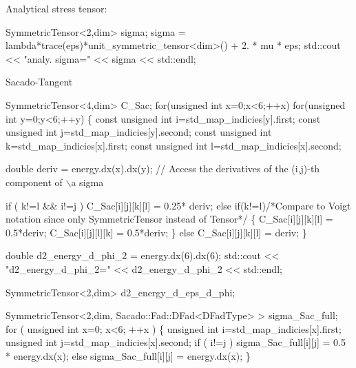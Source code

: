  Analytical stress tensor\+: 
\begin{DoxyCode}
SymmetricTensor<2,dim> sigma;
sigma = lambda*trace(eps)*unit\_symmetric\_tensor<dim>() + 2. * mu * eps;
std::cout << \textcolor{stringliteral}{"analy. sigma="} << sigma << std::endl;
\end{DoxyCode}
 Sacado-\/\+Tangent 
\begin{DoxyCode}
SymmetricTensor<4,dim> C\_Sac;
\textcolor{keywordflow}{for}(\textcolor{keywordtype}{unsigned} \textcolor{keywordtype}{int} x=0;x<6;++x)
   \textcolor{keywordflow}{for}(\textcolor{keywordtype}{unsigned} \textcolor{keywordtype}{int} y=0;y<6;++y)
   \{
       \textcolor{keyword}{const} \textcolor{keywordtype}{unsigned} \textcolor{keywordtype}{int} i=std\_map\_indicies[y].first;
       \textcolor{keyword}{const} \textcolor{keywordtype}{unsigned} \textcolor{keywordtype}{int} j=std\_map\_indicies[y].second;
       \textcolor{keyword}{const} \textcolor{keywordtype}{unsigned} \textcolor{keywordtype}{int} k=std\_map\_indicies[x].first;
       \textcolor{keyword}{const} \textcolor{keywordtype}{unsigned} \textcolor{keywordtype}{int} l=std\_map\_indicies[x].second;

       \textcolor{keywordtype}{double} deriv = energy.dx(x).dx(y); \textcolor{comment}{// Access the derivatives of the (i,j)-th component of \(\backslash\)a sigma}

       \textcolor{keywordflow}{if} ( k!=l && i!=j )
           C\_Sac[i][j][k][l] = 0.25* deriv;
       \textcolor{keywordflow}{else} \textcolor{keywordflow}{if}(k!=l)\textcolor{comment}{/*Compare to Voigt notation since only SymmetricTensor instead of Tensor*/}
       \{
           C\_Sac[i][j][k][l] = 0.5*deriv;
           C\_Sac[i][j][l][k] = 0.5*deriv;
       \}
       \textcolor{keywordflow}{else}
           C\_Sac[i][j][k][l] = deriv;
   \}

\textcolor{keywordtype}{double} d2\_energy\_d\_phi\_2 = energy.dx(6).dx(6);
std::cout << \textcolor{stringliteral}{"d2\_energy\_d\_phi\_2="} << d2\_energy\_d\_phi\_2 << std::endl;

SymmetricTensor<2,dim> d2\_energy\_d\_eps\_d\_phi;

SymmetricTensor<2,dim, Sacado::Fad::DFad<DFadType> > sigma\_Sac\_full;
\textcolor{keywordflow}{for} ( \textcolor{keywordtype}{unsigned} \textcolor{keywordtype}{int} x=0; x<6; ++x )
\{
   \textcolor{keywordtype}{unsigned} \textcolor{keywordtype}{int} i=std\_map\_indicies[x].first;
   \textcolor{keywordtype}{unsigned} \textcolor{keywordtype}{int} j=std\_map\_indicies[x].second;
   \textcolor{keywordflow}{if} ( i!=j )
       sigma\_Sac\_full[i][j] = 0.5 * energy.dx(x);
   \textcolor{keywordflow}{else}
       sigma\_Sac\_full[i][j] = energy.dx(x);
\}


\end{DoxyCode}
